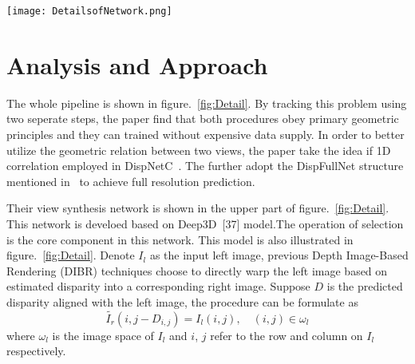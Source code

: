 \documentclass[10pt,twocolumn,letterpaper]{article}
\begin{document}
\begin{figure*}
\begin{center}
   \texttt{[image: DetailsofNetwork.png]}
\end{center}
   \caption{Details of our single view stereo matching network. Upper part is the view synthesis network. The input image is first processed by a CNN. It results in probabilistic disparity maps that help to reconstruct a synthetic right view by selectively taking pixels from nearby locations on the original left image. A stereo matching network, which is shown on the lower part of the figure, then takes both the original left image and synthetic right image to calculate an accurate disparity, which can be transformed into a corresponding depth map given the camera settings~\cite{Luo_2018_CVPR}.}
\label{fig:Detail}
\end{figure*}

\section{Analysis and Approach}
The whole pipeline is shown in figure.~\ref{fig:Detail}. By tracking this problem using two seperate steps, the paper find that both procedures obey primary geometric principles and they can trained without expensive data supply. In order to better utilize the geometric relation between two views, the paper take the idea if 1D correlation employed in DispNetC~\cite{Mayer_2016_CVPR}. The further adopt the DispFullNet structure mentioned in~\cite{Pang2017Cascade} to achieve full resolution prediction.\par
Their view synthesis network is shown in the upper part of figure.~\ref{fig:Detail}. This network is develoed based on Deep3D~[37] model.The operation of selection is the core component in this network. This model is also illustrated in figure.~\ref{fig:Detail}. Denote $I_l$ as the input left image, previous Depth Image-Based Rendering (DIBR) techniques choose to directly warp the left image based on estimated disparity into a corresponding right image. Suppose $D$ is the predicted disparity aligned with the left image, the procedure can be formulate as
\begin{equation}
\tilde{I_r}(i,j-D_{i,j})=I_l(i,j),\quad (i,j)\in\omega_l
\end{equation}
where $\omega_l$ is the image space of $I_l$ and $i$, $j$ refer to the row and column on $I_l$ respectively.\par
\end{document}
